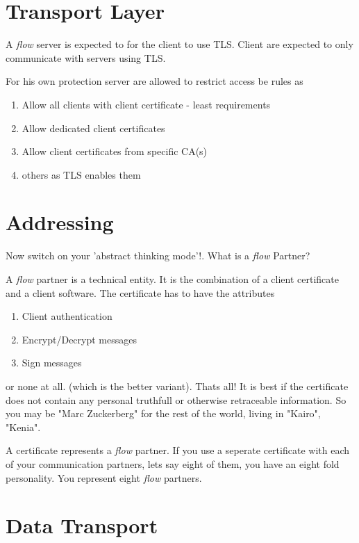 \documentclass[twoside,a4paper,english,12pt,authoryear,openright]{book}
\newcommand{\flow}{\textit{flow} }
\begin{document}
\section{Transport Layer}

A \flow server is expected to for the client to use TLS. Client are expected to only communicate with servers using TLS.

For his own protection server are allowed to restrict access be rules as

\begin{enumerate}
\item{Allow all clients with client certificate - least requirements}
\item{Allow dedicated client certificates}
\item{Allow client certificates from specific CA(s)}
\item{others as TLS enables them}
\end{enumerate}


\section{Addressing}

Now switch on your 'abstract thinking mode'!. What is a \flow Partner?

A \flow partner is a technical entity. It is the combination of a client certificate and a client software. The certificate has to have the attributes

\begin{enumerate}
\item{Client authentication}
\item{Encrypt/Decrypt messages}
\item{Sign messages}
\end{enumerate}

or none at all. (which is the better variant). Thats all! It is best if the certificate does not contain any personal truthfull or otherwise retraceable information. So you may be "Marc Zuckerberg" for the rest of the world, living in "Kairo", "Kenia".

A certificate represents a \flow partner. If you use a seperate certificate with each of your communication partners, lets say eight of them, you have an eight fold personality. You represent eight \flow partners.


\section{Data Transport}
\end{document}
